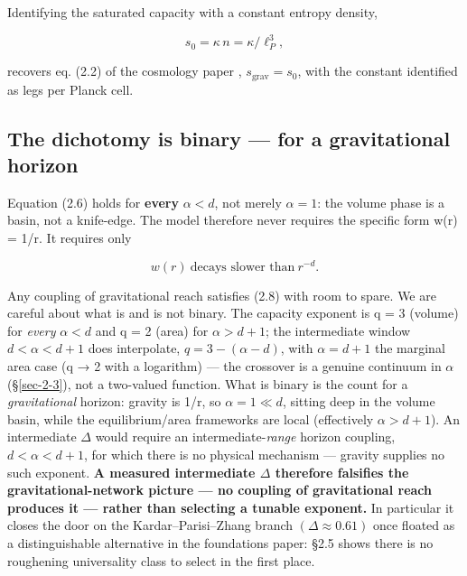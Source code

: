 \documentclass[aps,prd,preprint,nofootinbib,superscriptaddress]{revtex4-2}
\begin{document}
Identifying the saturated capacity with a constant entropy density,

\begin{equation}s_0 = \kappa\, n = \kappa/\ell_P^3, \tag{2.7}\end{equation}

recovers eq. (2.2) of the cosmology paper \citep{Pandev:2026cosmology},
\(s_{\mathrm{grav}} = s_{0}\), with the constant identified as legs per
Planck cell.

\subsection{The dichotomy is binary --- for a gravitational
horizon}\label{sec-2-4}

Equation (2.6) holds for \textbf{every} \(\alpha  < d\), not merely
\(\alpha  = 1\): the volume phase is a basin, not a knife-edge. The
model therefore never requires the specific form w(r) = 1/r. It requires
only

\begin{equation}w(r)\ \text{decays slower than}\ r^{-d}. \tag{2.8}\end{equation}

Any coupling of gravitational reach satisfies (2.8) with room to spare.
We are careful about what is and is not binary. The capacity exponent is
q = 3 (volume) for \emph{every} \(\alpha  < d\) and q = 2 (area) for
\(\alpha  > d+1\); the intermediate window \(d < \alpha  < d+1\) does
interpolate, \(q = 3 - (\alpha  - d)\), with \(\alpha  = d+1\) the
marginal area case (q → 2 with a logarithm) --- the crossover is a
genuine continuum in \(\alpha\) (§\ref{sec-2-3}), not a two-valued
function. What is binary is the count for a \emph{gravitational}
horizon: gravity is 1/r, so \(\alpha  = 1 \ll  d\), sitting deep in the
volume basin, while the equilibrium/area frameworks are local
(effectively \(\alpha  > d+1\)). An intermediate \(\Delta\) would
require an intermediate-\emph{range} horizon coupling,
\(d < \alpha  < d+1\), for which there is no physical mechanism ---
gravity supplies no such exponent. \textbf{A measured intermediate
\(\Delta\) therefore falsifies the gravitational-network picture --- no
coupling of gravitational reach produces it --- rather than selecting a
tunable exponent.} In particular it closes the door on the
Kardar--Parisi--Zhang branch \((\Delta  \approx  0.61)\) once floated as
a distinguishable alternative in the foundations paper: §2.5 shows there
is no roughening universality class to select in the first place.
\end{document}
